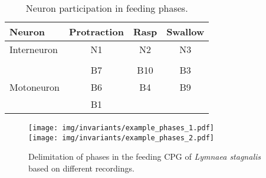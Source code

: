 \begin{table}[h!]
	\centering
	\begin{tabular}{lccc}
		Neuron                                           & \multicolumn{1}{l}{Protraction} & \multicolumn{1}{l}{Rasp} & \multicolumn{1}{l}{Swallow} \\ \hline
		Interneuron                                     & N1                              & N2                       & N3                          \\
		& \multicolumn{1}{l}{}            & \multicolumn{1}{l}{}     & \multicolumn{1}{l}{}        \\
		\multicolumn{1}{c}{\multirow{3}{*}{Motoneuron}} & B7                              & B10                      & B3                        \\
		\multicolumn{1}{c}{}                            & B6                              & B4                       & B9                        \\
		\multicolumn{1}{c}{}                            & B1                              &                          &                         
	\end{tabular}
	\caption{Neuron participation in feeding phases.}
	\label{table:tabla spikes}
\end{table}



\begin{figure}[bth!]
\centering
\texttt{[image: img/invariants/example\_phases\_1.pdf]}
\\
\vspace{10pt}
\texttt{[image: img/invariants/example\_phases\_2.pdf]}
\caption{Delimitation of phases in the feeding CPG of \textit{Lymnaea stagnalis} based on different recordings.}
\label{fig:example lymnaea phases recording}
\end{figure}
